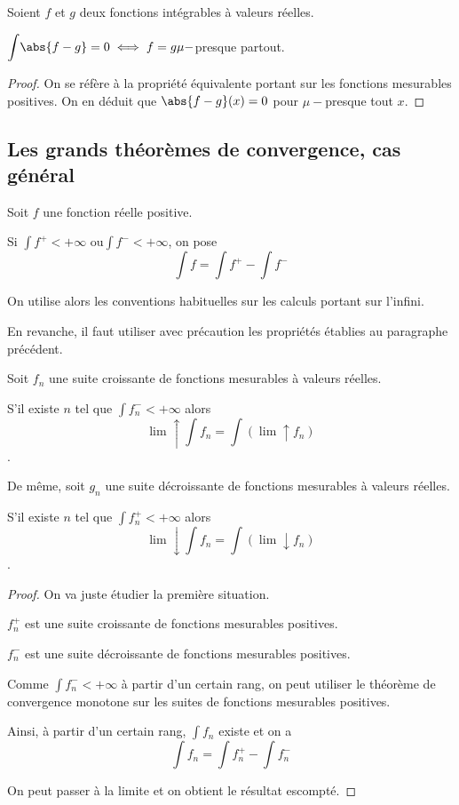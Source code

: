 \begin{prop}
Soient $f$ et $g$ deux fonctions intégrables à valeurs réelles.

$\displaystyle{\int} \abs{f-g} = 0 \iff f=g \mu-$presque partout.
\end{prop}

\begin{proof}
On se réfère à la propriété équivalente portant sur les fonctions mesurables positives. On en déduit que $\abs{f-g}(x)=0$ pour $\mu-$presque tout $x$.
\end{proof}

\subsection{Les grands théorèmes de convergence, cas général}

\begin{de}
Soit $f$ une fonction réelle positive.

Si $\displaystyle{\int} f^{+} < +\infty$ ou$\displaystyle{\int} f^{-} < +\infty$, on pose
\[
\displaystyle{\int} f = \displaystyle{\int} f^{+}- \displaystyle{\int} f^{-}
\]

On utilise alors les conventions habituelles sur les calculs portant sur l'infini.

En revanche, il faut utiliser avec précaution les propriétés établies au paragraphe précédent.
\end{de}


\begin{theo}
Soit $f_n$ une suite croissante de fonctions mesurables à valeurs réelles.

S'il existe $n$ tel que $\displaystyle{\int} f_n^{-} < +\infty$ alors
\[\lim \uparrow \displaystyle{\int} f_n =  \displaystyle{\int} \left(\lim \uparrow f_n\right)\].

\medskip
De même, soit $g_n$ une suite décroissante de fonctions mesurables à valeurs réelles.

S'il existe $n$ tel que $\displaystyle{\int} f_n^{+} < +\infty$ alors
\[\lim \downarrow \displaystyle{\int} f_n =  \displaystyle{\int} \left(\lim \downarrow f_n\right)\].
\end{theo}

\begin{proof}
On va juste étudier la première situation. 

$f_n^{+}$ est une suite croissante de fonctions mesurables positives.

$f_n^{-}$ est une suite décroissante de fonctions mesurables positives.

Comme $\displaystyle{\int} f_n^{-}<+\infty$ à partir d'un certain rang, on peut utiliser le théorème de convergence monotone sur les suites de fonctions mesurables positives.

Ainsi, à partir d'un certain rang, $\displaystyle{\int} f_n$ existe et on a
\[
\displaystyle{\int} f_n = \displaystyle{\int} f_n^{+} - \displaystyle{\int} f_n^{-}
\]

On peut passer à la limite et on obtient le résultat escompté.
\end{proof}


